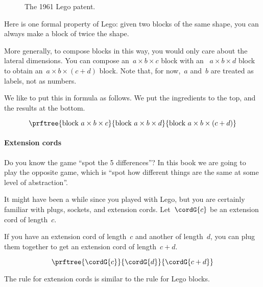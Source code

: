 \begin{figure*}[p]
  \centering
%
  \caption{The 1961 Lego patent.}
\end{figure*}
Here is one formal property of Lego: given two blocks of the same shape, you can always make a block of twice the shape.

More generally, to compose blocks in this way, you would only care about the lateral dimensions.
You can compose an~$a \times b \times c$ block with an ~$a \times b \times d$ block to obtain an~$a \times b \times( c + d)$ block.
Note that, for now,~$a$ and~$b$ are treated as labels, not as numbers.

We like to put this in formula as follows. We put the ingredients to the top, and the results at the bottom.

\begin{equation}
  \prftree{\text{block } a \times b \times c}{\text{block } a \times b \times d }{%
    \text{block } a \times b \times (c+d)
  }
\end{equation}

\paragraph{Extension cords}

Do you know the game ``spot the 5 differences''? In this book we are going to play the opposite game, which is ``spot how different things are the same at some level of abstraction''.

It might have been a while since you played with Lego, but you are certainly familiar with plugs, sockets, and extension cords.
Let~$\cordG{c}$ be an extension cord of length~$c$.

If you have an extension cord of length~$c$ and another of length~$d$, you can plug them together to get an extension cord of length~$c+d$.

\begin{equation}\label{eq:cords}
  \prftree{\cordG{c}}{\cordG{d}}{\cordG{c+d}}
\end{equation}

The rule for extension cords is similar to the rule for Lego blocks.
%



